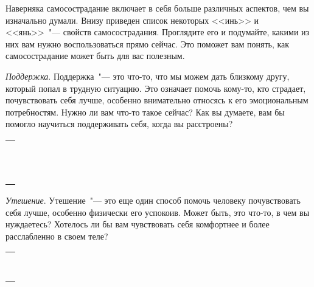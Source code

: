 \newpage
{}

Наверняка самосострадание включает в себя больше различных аспектов, чем вы изначально думали. Внизу приведен список некоторых <<инь>> и <<янь>>~"--- свойств самосострадания. Проглядите его и подумайте, какими из них вам нужно воспользоваться прямо сейчас. Это поможет вам понять, как самосострадание может быть для вас полезным.

\vspace{3ex}

\begin{itemize}
	\itemyinyang \textit{Поддержка}. Поддержка~"--- это что-то, что мы можем дать близкому другу, который попал в трудную ситуацию. Это означает помочь кому-то, кто страдает, почувствовать себя лучше, особенно внимательно относясь к его эмоциональным потребностям. Нужно ли вам что-то такое сейчас? Как вы думаете, вам бы помогло научиться поддерживать себя, когда вы расстроены?
\end{itemize}

\setlength{\extrarowheight}{2mm}
\begin{tabularx}{\textwidth}{X}
	\\
	\arrayrulecolor{gray}\hline\\
	\hline\\
	\hline\\
	\hline\\
	\hline\\
	\hline\\
	\hline\\
	\hline\\
	\hline\\
	\hline\\
	\hline\\
	\hline\\
	\hline\\	
\end{tabularx}
\setlength{\extrarowheight}{0mm}

\begin{itemize}
	\itemyinyang \textit{Утешение}. Утешение~"--- это еще один способ помочь человеку почувствовать себя лучше, особенно физически его успокоив. Может быть, это что-то, в чем вы нуждаетесь? Хотелось ли бы вам чувствовать себя комфортнее и более расслабленно в своем теле? 
\end{itemize}

\setlength{\extrarowheight}{2mm}
\begin{tabularx}{\textwidth}{X}
	\\
	\arrayrulecolor{gray}\hline\\
	\hline\\
	\hline\\
	\hline\\
	\hline\\
	\hline\\
	\hline\\
	\hline\\
	\hline\\
\end{tabularx}
\setlength{\extrarowheight}{0mm}

